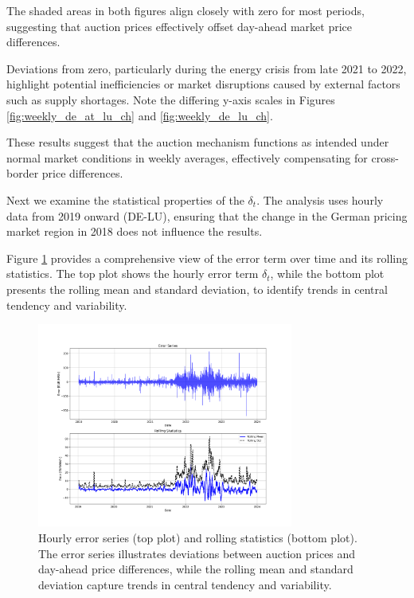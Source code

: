 \documentclass[12pt]{article}
\begin{document}
The shaded areas in both figures align closely with zero for most periods, suggesting that auction prices effectively offset day-ahead market price differences.

Deviations from zero, particularly during the energy crisis from late 2021 to 2022, highlight potential inefficiencies or market disruptions caused by external factors such as supply shortages. Note the differing y-axis scales in Figures \ref{fig:weekly_de_at_lu_ch} and \ref{fig:weekly_de_lu_ch}.

\noindent
These results suggest that the auction mechanism functions as intended under normal market conditions in weekly averages, effectively compensating for cross-border price differences.


Next we examine the statistical properties of the $\delta_t$. The analysis uses hourly data from 2019 onward (DE-LU), ensuring that the change in the German pricing market region in 2018 does not influence the results.

Figure \ref{fig:error_series} provides a comprehensive view of the error term over time and its rolling statistics. The top plot shows the hourly error term $\delta_t$, while the bottom plot presents the rolling mean and standard deviation, to identify trends in central tendency and variability.

\begin{figure}[ht]
    \centering
    \includegraphics[width=0.75\textwidth]{figures/error_series.png}
    \caption{Hourly error series (top plot) and rolling statistics (bottom plot). The error series illustrates deviations between auction prices and day-ahead price differences, while the rolling mean and standard deviation capture trends in central tendency and variability.}
    \label{fig:error_series}
\end{figure}
\end{document}
